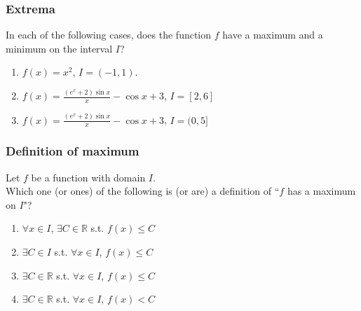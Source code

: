 \begin{frame}
	\frametitle{Extrema}

	In each of the following cases, does the function $f$ have a maximum and a minimum
	on the interval $I$?

	\begin{enumerate}
		\item $\displaystyle f(x) = x^{2}$, \quad $\displaystyle I = (-1,1)$.

		\item $\displaystyle f(x) = \frac{(e^{x}+ 2) \sin x}{x}- \cos x + 3$, \quad
			$\displaystyle I = [2,6]$

		\item $\displaystyle f(x) = \frac{(e^{x}+ 2) \sin x}{x}- \cos x + 3$, \quad
			$\displaystyle I = (0,5]$
	\end{enumerate}
\end{frame}

\begin{frame}
	\frametitle{Definition of maximum}

	Let $f$ be a function with domain $I$. \\ Which one (or ones) of the following
	is (or are) a definition of \quad ``$f$ has a maximum on $I$"?

	\begin{enumerate}
		\item $\displaystyle \forall x \in I$,
			$\displaystyle \exists C \in \mathbb{R}$ s.t. $\displaystyle f(x) \leq C$

		\item $\displaystyle \exists C \in I$ s.t. $\displaystyle \forall x \in I$, $\displaystyle
			f(x) \leq C$

		\item $\displaystyle \exists C \in \mathbb{R}$ s.t.
			$\displaystyle \forall x \in I$, $\displaystyle f(x) \leq C$

		\item $\displaystyle \exists C \in \mathbb{R}$ s.t.
			$\displaystyle \forall x \in I$, $\displaystyle f(x) < C$
	\end{enumerate}
\end{frame}


